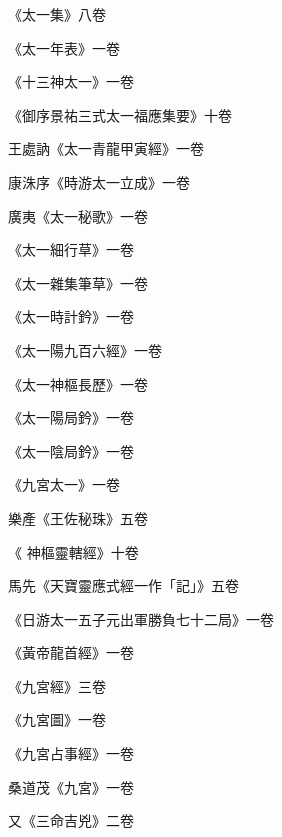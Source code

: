 \begin{pinyinscope}
 《太一集》八卷



 《太一年表》一卷



 《十三神太一》一卷



 《御序景祐三式太一福應集要》十卷



 王處訥《太一青龍甲寅經》一卷



 康洙序《時游太一立成》一卷



 廣夷《太一秘歌》一卷



 《太一細行草》一卷



 《太一雜集筆草》一卷



 《太一時計鈐》一卷



 《太一陽九百六經》一卷



 《太一神樞長歷》一卷



 《太一陽局鈐》一卷



 《太一陰局鈐》一卷



 《九宮太一》一卷



 樂產《王佐秘珠》五卷



 《
 神樞靈轄經》十卷



 馬先《天寶靈應式經一作「記」》五卷



 《日游太一五子元出軍勝負七十二局》一卷



 《黃帝龍首經》一卷



 《九宮經》三卷



 《九宮圖》一卷



 《九宮占事經》一卷



 桑道茂《九宮》一卷



 又《三命吉兇》二卷




\end{pinyinscope}
